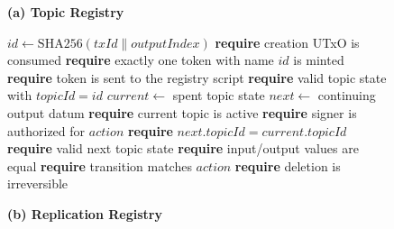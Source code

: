 
\begin{figure}[!t]
    \centering
    \footnotesize

    \begin{minipage}[t]{0.49\textwidth}
        \vspace{0pt}
        \textbf{(a) Topic Registry}
        \vspace{2pt}

        \begin{algorithmic}[1]
                \State $id \gets \mathrm{SHA256}(txId \parallel outputIndex)$
                \State \textbf{require} creation UTxO is consumed
                \State \textbf{require} exactly one token with name $id$ is minted
                \State \textbf{require} token is sent to the registry script
                \State \textbf{require} valid topic state with $topicId = id$
            \Else
                \State $current \gets$ spent topic state
                \State $next \gets$ continuing output datum
                \State \textbf{require} current topic is active
                \State \textbf{require} signer is authorized for $action$
                \State \textbf{require} $next.topicId = current.topicId$
                \State \textbf{require} valid next topic state
                \State \textbf{require} input/output values are equal
                \State \textbf{require} transition matches $action$
                \State \textbf{require} deletion is irreversible
            \EndIf
        \end{algorithmic}
    \end{minipage}
    \hfill
    \begin{minipage}[t]{0.49\textwidth}
        \vspace{0pt}
        \textbf{(b) Replication Registry}
        \vspace{2pt}


\end{minipage}
\end{figure}
